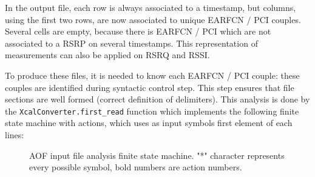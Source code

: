 \documentclass[a4paper, 11pt]{report}
\begin{document}
    In the output file, each row is always associated to a timestamp, but columns, using the first two rows, are now associated to unique EARFCN / PCI couples. Several cells are empty, because there is EARFCN / PCI which are not associated to a RSRP on several timestamps. This representation of measurements can also be applied on RSRQ and RSSI. \newline
    
    To produce these files, it is needed to know each EARFCN / PCI couple: these couples are identified during syntactic control step. This step ensures that file sections are well formed (correct definition of delimiters). This analysis is done by the \texttt{XcalConverter.first\_read} function which implements the following finite state machine with actions, which uses as input symbols first element of each lines: 
    
    \begin{figure}[H]
        \centering
        \caption{AOF input file analysis finite state machine. "*" character represents every possible symbol, bold numbers are action numbers.}
        \label{AOF input file analysis finite state machine}
    \end{figure}
    
\end{document}
